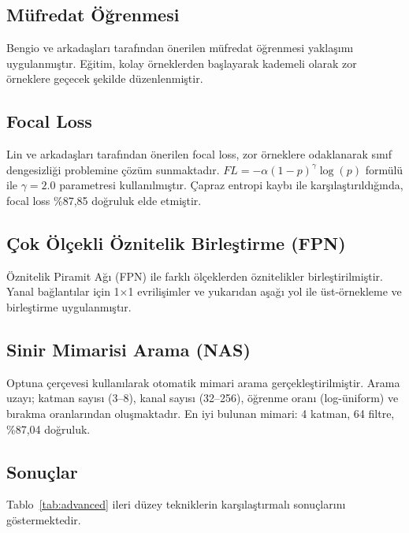 \documentclass[conference]{IEEEtran}
\begin{document}
\subsection{M\"{u}fredat \"{O}\u{g}renmesi}
Bengio ve arkada\c{s}lar{\i} \cite{bengio2009curriculum} taraf{\i}ndan \"{o}nerilen m\"{u}fredat \"{o}\u{g}renmesi yakla\c{s}{\i}m{\i} uygulanm{\i}\c{s}t{\i}r. E\u{g}itim, kolay \"{o}rneklerden ba\c{s}layarak kademeli olarak zor \"{o}rneklere ge\c{c}ecek \c{s}ekilde d\"{u}zenlenmi\c{s}tir.

\subsection{Focal Loss}
Lin ve arkada\c{s}lar{\i} \cite{lin2017focal} taraf{\i}ndan \"{o}nerilen focal loss, zor \"{o}rneklere odaklanarak s{\i}n{\i}f dengesizli\u{g}i problemine \c{c}\"{o}z\"{u}m sunmaktad{\i}r. $FL = -\alpha(1-p)^\gamma \log(p)$ form\"{u}l\"{u} ile $\gamma = 2.0$ parametresi kullan{\i}lm{\i}\c{s}t{\i}r. \c{C}apraz entropi kayb{\i} ile kar\c{s}{\i}la\c{s}t{\i}r{\i}ld{\i}\u{g}{\i}nda, focal loss \%87,85 do\u{g}ruluk elde etmi\c{s}tir.

\subsection{\c{C}ok \"{O}l\c{c}ekli \"{O}znitelik Birle\c{s}tirme (FPN)}
\"{O}znitelik Piramit A\u{g}{\i} (FPN) \cite{lin2017feature} ile farkl{\i} \"{o}l\c{c}eklerden \"{o}znitelikler birle\c{s}tirilmi\c{s}tir. Yanal ba\u{g}lant{\i}lar i\c{c}in 1$\times$1 evrili\c{s}imler ve yukar{\i}dan a\c{s}a\u{g}{\i} yol ile \"{u}st-\"{o}rnekleme ve birle\c{s}tirme uygulanm{\i}\c{s}t{\i}r.

\subsection{Sinir Mimarisi Arama (NAS)}
Optuna \cite{akiba2019optuna} \c{c}er\c{c}evesi kullan{\i}larak otomatik mimari arama ger\c{c}ekle\c{s}tirilmi\c{s}tir. Arama uzay{\i}; katman say{\i}s{\i} (3--8), kanal say{\i}s{\i} (32--256), \"{o}\u{g}renme oran{\i} (log-\"{u}niform) ve b{\i}rakma oranlar{\i}ndan olu\c{s}maktad{\i}r. En iyi bulunan mimari: 4 katman, 64 filtre, \%87,04 do\u{g}ruluk.

\subsection{Sonu\c{c}lar}
Tablo~\ref{tab:advanced} ileri d\"{u}zey tekniklerin kar\c{s}{\i}la\c{s}t{\i}rmal{\i} sonu\c{c}lar{\i}n{\i} g\"{o}stermektedir.
\end{document}
